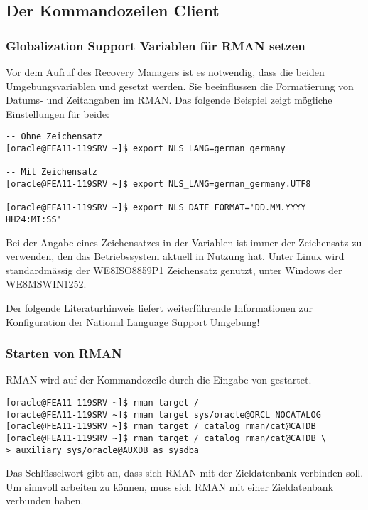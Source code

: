       \subsection{Der Kommandozeilen Client}
        \subsubsection{Globalization Support Variablen für RMAN setzen}
          Vor dem Aufruf des Recovery Managers ist es notwendig, dass die beiden Umgebungsvariablen  und  gesetzt werden. Sie beeinflussen die Formatierung von Datums- und Zeitangaben im RMAN. Das folgende Beispiel zeigt mögliche Einstellungen für beide:
          \begin{lstlisting}[caption={Beispiel für \identifier{nls\_date\_format} und \identifier{nls\_lang}},label=admin1000,language=terminal]
-- Ohne Zeichensatz
[oracle@FEA11-119SRV ~]$ export NLS_LANG=german_germany

-- Mit Zeichensatz
[oracle@FEA11-119SRV ~]$ export NLS_LANG=german_germany.UTF8

[oracle@FEA11-119SRV ~]$ export NLS_DATE_FORMAT='DD.MM.YYYY HH24:MI:SS'
          \end{lstlisting}
\clearpage
          \begin{merke}
            Bei der Angabe eines Zeichensatzes in der Variablen  ist immer der Zeichensatz zu verwenden, den das Betriebssystem aktuell in Nutzung hat. Unter Linux wird standardmässig der WE8ISO8859P1 Zeichensatz genutzt, unter Windows der WE8MSWIN1252.
          \end{merke}
          Der folgende Literaturhinweis liefert weiterführende Informationen zur Konfiguration der National Language Support Umgebung!
          \begin{literaturinternet}
            \item \cite{NLSPG189}
          \end{literaturinternet}
        \subsubsection{Starten von RMAN}
          RMAN wird auf der Kommandozeile durch die Eingabe von  gestartet.
          \begin{lstlisting}[caption={Starten des RMAN},label=admin1001,language=terminal]
[oracle@FEA11-119SRV ~]$ rman target /
[oracle@FEA11-119SRV ~]$ rman target sys/oracle@ORCL NOCATALOG
[oracle@FEA11-119SRV ~]$ rman target / catalog rman/cat@CATDB
[oracle@FEA11-119SRV ~]$ rman target / catalog rman/cat@CATDB \
> auxiliary sys/oracle@AUXDB as sysdba
          \end{lstlisting}
          \begin{merke}
            Das Schlüsselwort  gibt an, dass sich RMAN mit der Zieldatenbank verbinden soll. Um sinnvoll arbeiten zu können, muss sich RMAN mit einer Zieldatenbank verbunden haben.
          \end{merke}

